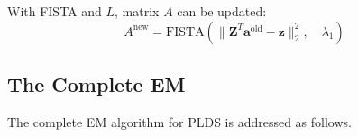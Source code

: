 \documentclass[fleqn]{article}
\newcommand{\T}{T}
\begin{document}
%
%



With FISTA and $L$, matrix $A$ can be updated:
\begin{equation}\label{eq:updatea}
A^{\text{new}} = \text{FISTA}(\|\mathbf{Z}^{\T}\mathbf{a}^{\text{old}} -\mathbf{z}\|_2^2,\quad \lambda_1)
\end{equation}

\subsection{The Complete EM}
The complete EM algorithm for PLDS is addressed as follows.\\
\end{document}
